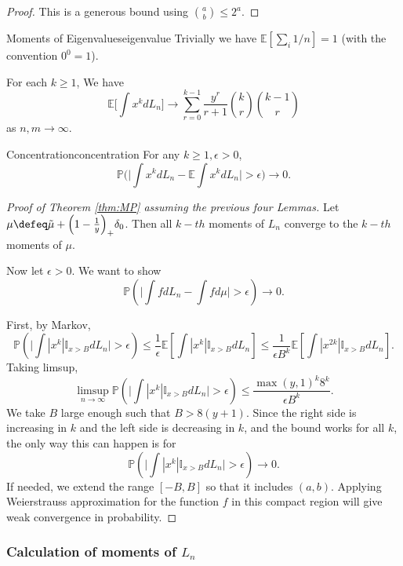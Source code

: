 \begin{proof}
    This is a generous bound using $\binom{a}{b}\leq 2^a$.
\end{proof}
\begin{alemma}{Moments of Eigenvalues}{eigenvalue}
    Trivially we have $\mathbb{E}[\sum_{i} 1 /n]=1$ (with the convention $0^0=1$).
    
    For each $k\geq 1$, We have \[
        \mathbb{E}\Big[\int x^k dL_n\Big]\to  \sum_{r=0}^{k-1}\frac{y^r}{r+1} \binom{k}{r}\binom{k-1}{r}
    \]
    as $n,m\to \infty$.
\end{alemma}
\begin{alemma}{Concentration}{concentration}
    For any $k\geq 1,\epsilon>0$, \[
    \mathbb{P}\Bigg(\Big|\int x^k dL_n - \mathbb{E}\int x^k dL_n\Big|>\epsilon\Bigg)\to 0.
    \]
\end{alemma}
\begin{proof}[Proof of Theorem \ref{thm:MP} assuming the previous four Lemmas]
    Let $ \mu \defeq \tilde{\mu}+ \Big(1-\frac{1}{y}\Big)_{+}\delta_0 $. Then all $k-th$ moments of $L_n$ converge to the $k-th$ moments of $\mu$. 

    Now let $\epsilon>0$. We want to show \[
    \mathbb{P}\left(\Big| \int f d L_n - \int f d \mu \Big|>\epsilon\right)\to 0.
    \]

    First, by Markov,  \[
    \mathbb{P}\left(\Big|\int |x^k|\mathbb{I}_{x>B}d L_n\Big|>\epsilon \right)\leq \frac{1}{\epsilon}\mathbb{E}\left[\int |x^k|\mathbb{I}_{x>B}d L_n\right]\leq \frac{1}{\epsilon B^k}\mathbb{E}\left[\int |x^{2k}|\mathbb{I}_{x>B}d L_n\right].
    \]
    Taking limsup, \[
       \limsup_{n\to \infty} \mathbb{P}\left(\Big|\int |x^k|\mathbb{I}_{x>B}d L_n\Big|>\epsilon \right)\leq\frac{\max(y,1)^k8^k}{\epsilon B^k}.
    \]
    We take $B$ large enough such that $B>8(y+1)$. Since the right side is increasing in $k$ and the left side is decreasing in $k$, and the bound works for all $k$, the only way this can happen is for \[
        \mathbb{P}\left(\Big|\int |x^k|\mathbb{I}_{x>B}d L_n\Big|>\epsilon \right)\to 0.
    \]
    If needed, we extend the range $[-B,B]$ so that it includes $(a,b)$. Applying Weierstrauss approximation for the function $f$ in this compact region will give weak convergence in probability.
\end{proof}

\subsubsection*{Calculation of moments of $L_n$}

